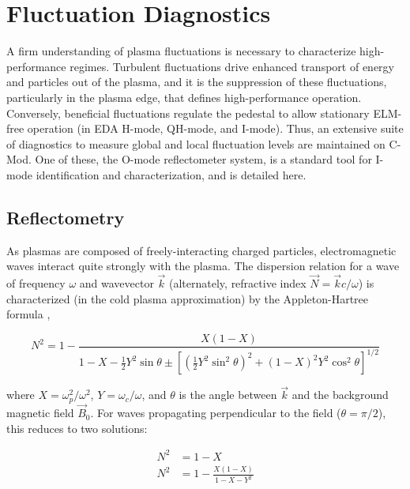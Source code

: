 \section{Fluctuation Diagnostics}\label{sec:app_fluct}

A firm understanding of plasma fluctuations is necessary to characterize high-performance regimes.  Turbulent fluctuations drive enhanced transport of energy and particles out of the plasma, and it is the suppression of these fluctuations, particularly in the plasma edge, that defines high-performance operation.  Conversely, beneficial fluctuations regulate the pedestal to allow stationary ELM-free operation (\eg in EDA H-mode, QH-mode, and I-mode).  Thus, an extensive suite of diagnostics to measure global and local fluctuation levels are maintained on C-Mod.  One of these, the O-mode reflectometer system, is a standard tool for I-mode identification and characterization, and is detailed here.

\subsection{Reflectometry}\label{subsec:app_reflect}

As plasmas are composed of freely-interacting charged particles, electromagnetic waves interact quite strongly with the plasma.  The dispersion relation for a wave of frequency $\omega$ and wavevector $\vec{k}$ (alternately, refractive index $\vec{N} = \vec{k}c/\omega$) is characterized (in the cold plasma approximation) by the Appleton-Hartree formula \cite[\S 4]{Hutchinson},

\begin{equation}\label{eq:appletonhartree}
  N^2 = 1 - \frac{X(1-X)}{1 - X - \frac{1}{2} Y^2 \sin \theta \pm \left[ \left( \frac{1}{2} Y^2 \sin^2 \theta \right)^2 + \left(1 - X\right)^2 Y^2 \cos^2 \theta \right]^{1/2}}
\end{equation}

\noindent where $X = \omega_p^2/\omega^2$, $Y = \omega_c/\omega$, and $\theta$ is the angle between $\vec{k}$ and the background magnetic field $\vec{B}_0$.  For waves propagating perpendicular to the field ($\theta = \pi/2$), this reduces to two solutions:

\begin{equation}\label{eq:perpwave}
 \begin{aligned}
  N^2 &= 1-X\\
  N^2 &= 1 - \frac{X(1-X)}{1-X-Y^2}
 \end{aligned}
\end{equation}

